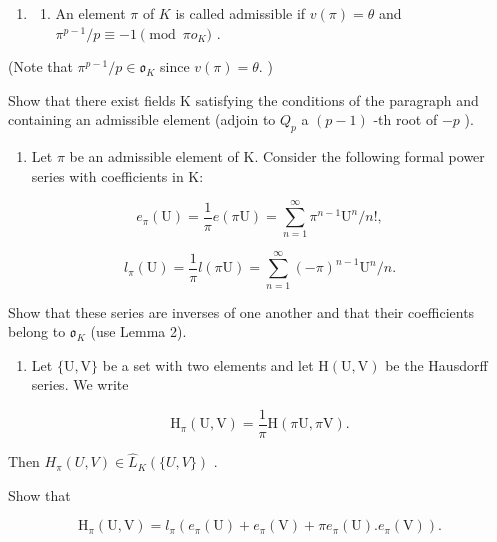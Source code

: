 \begin{enumerate}
\def\labelenumi{\arabic{enumi}.}
\tightlist
\item
  \begin{enumerate}
  \def\labelenumii{(\alph{enumii})}
  \tightlist
  \item
    An element \(\pi\) of \(K\) is called admissible if \(v(\pi) = \theta\) and \(\pi^{p-1} / p \equiv -1 \pmod{\pi o_K}\) .
  \end{enumerate}
\end{enumerate}

(Note that \(\pi^{p-1}/p\in\mathfrak{o}_{K}\) since \(v(\pi)=\theta.\) )

Show that there exist fields K satisfying the conditions of the paragraph and containing an admissible element (adjoin to \(Q_{p}\) a \((p - 1)\) -th root of \(-p\) ).

\begin{enumerate}
\def\labelenumi{(\alph{enumi})}
\setcounter{enumi}{1}
\tightlist
\item
  Let \(\pi\) be an admissible element of K. Consider the following formal power series with coefficients in K:
\end{enumerate}

\[
e _ {\pi} (\mathrm{U}) = \frac {1}{\pi} e (\pi \mathrm{U}) = \sum_ {n = 1} ^ {\infty} \pi^ {n - 1} \mathrm{U} ^ {n} / n!,
\]

\[
l _ {\pi} (\mathrm{U}) = \frac {1}{\pi} l (\pi \mathrm{U}) = \sum_ {n = 1} ^ {\infty} (- \pi) ^ {n - 1} \mathrm{U} ^ {n} / n.
\]

Show that these series are inverses of one another and that their coefficients belong to \(\mathfrak{o}_{K}\) (use Lemma 2).

\begin{enumerate}
\def\labelenumi{(\alph{enumi})}
\setcounter{enumi}{2}
\tightlist
\item
  Let \(\{\mathrm{U},\mathrm{V}\}\) be a set with two elements and let \(\mathrm{H}(\mathrm{U},\mathrm{V})\) be the Hausdorff series. We write
\end{enumerate}

\[
\mathrm{H} _ {\pi} (\mathrm{U}, \mathrm{V}) = \frac {1}{\pi} \mathrm{H} (\pi \mathrm{U}, \pi \mathrm{V}).
\]

Then \(H_{\pi}(U, V) \in \hat{L}_{K}(\{U, V\})\) .

Show that

\[
\mathrm{H} _ {\pi} (\mathrm{U}, \mathrm{V}) = l _ {\pi} (e _ {\pi} (\mathrm{U}) + e _ {\pi} (\mathrm{V}) + \pi e _ {\pi} (\mathrm{U}). e _ {\pi} (\mathrm{V})).
\]

